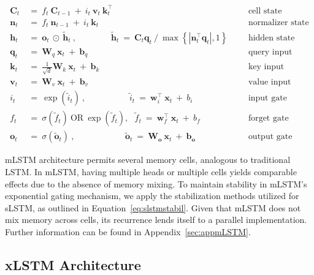 \begin{align}
\label{eq:mlstm_recurrent_begin}
\mathbf{C}_t \ &= \  f_t \ \mathbf{C}_{t-1} \ + \ 
  i_t \ \mathbf{v}_t \ \mathbf{k}_t^\top & &  &\text{cell state} \\
\mathbf{n}_t \ &= \  f_t \ \mathbf{n}_{t-1} \ + \ 
  i_t \ \mathbf{k}_t & &  &\text{normalizer state} \\
\mathbf{h}_t  \ &= \ \mathbf{o}_t \ \odot \ \tilde{\mathbf{h}}_t
\ , \qquad \qquad 
\tilde{\mathbf{h}}_t \ = \   \mathbf{C}_t \mathbf{q}_t \ / \ 
  \max \left\{ |\mathbf{n}_t^\top \mathbf{q}_t|, 1 \right\} 
   &&&\text{hidden state} \\
\mathbf{q}_t \ &= \ \mathbf{W}_q \ \mathbf{x}_t \ + \ \mathbf{b}_q  & &  &\text{query input} \\
\mathbf{k}_t \ &= \ \frac{1}{\sqrt{d}} \mathbf{W}_k \ \mathbf{x}_t \ + \ \mathbf{b}_k  & &  &\text{key input} \\
\mathbf{v}_t \ &= \ \mathbf{W}_v \ \mathbf{x}_t \ + \ \mathbf{b}_v  & &  &\text{value input} \\
i_t \ &= \ \!\exp \!  \! \left( \tilde{i}_t  \right) \ , 
 \qquad \qquad \ \ \ \ \,
  \tilde{i}_t \ = \ \mathbf{w}^\top_{i} \ \mathbf{x}_t \ + \  b_{i} \ \ \ 
  &&&\text{input gate} \\
f_t \ &= \ \sigma \!  \left(  \tilde{f}_t \right) \ \text{OR} \ \!\exp \!  \! \left(  \tilde{f}_t \right) , \ \ \: \!
\tilde{f}_t \ = \ \mathbf{w}^\top_{f} \ \mathbf{x}_t  \ + \
  b_{f}
  &&& \text{forget gate} \\
\label{eq:mlstm_recurrent_end}
\mathbf{o}_t \ &= \ \sigma \left( \tilde{\mathbf{o}}_t \right) \ , \qquad \qquad \quad \ \ \ \,
  \tilde{\mathbf{o}}_t  \ = \ \mathbf{W}_{\mathbf{o}} \ \mathbf{x}_t \ + \
  \mathbf{b}_{\mathbf{o}}
  &&&\text{output gate} 
\end{align}

mLSTM architecture permits several memory cells, analogous to traditional LSTM. In mLSTM, having multiple heads or multiple cells yields comparable effects due to the absence of memory mixing. To maintain stability in mLSTM's exponential gating mechanism, we apply the stabilization methods utilized for sLSTM, as outlined in Equation~\ref{eq:slstmstabil}. 
Given that mLSTM does not mix memory across cells, its recurrence lends itself to a parallel implementation. Further information can be found in Appendix~\ref{sec:appmLSTM}.

\subsection{xLSTM Architecture}
\label{sec:xLSTMarch}

